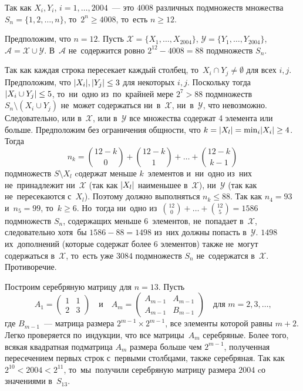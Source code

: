 \ifincludesolutions
Так как $X_i, Y_i$, $i = 1, \ldots, 2004$~--- это $4008$ различных подмножеств
множества $S_n = \{ 1, 2, \dots, n \}$, то~$2^n \geq 4008$, то~есть
$n \geq 12$.
\par
Предположим, что $n = 12$.
Пусть
$\mathcal{X} = \{ X_1, \ldots, X_{2004} \}$,
$\mathcal{Y} = \{ Y_1, \ldots, Y_{2004} \}$,
$\mathcal{A} = \mathcal{X} \cup \mathcal{Y}$.
В~$\mathcal{A}$ не~содержится ровно $2^{12} - 4008 = 88$ подмножеств $S_n$.
\par
Так как каждая строка пересекает каждый столбец,
то~$X_i \cap Y_j \neq \emptyset$ для всех $i, j$.
Предположим, что $\lvert X_i \rvert, \lvert Y_j \rvert \leq 3$ для некоторых $i, j$.
Поскольку тогда $\lvert X_i \cup Y_j \rvert \leq 5$, то~ни~одно из~по~крайней мере
$2^7 > 88$ подмножеств $S_n \setminus (X_i \cup Y_j)$ не~может содержаться
ни~в~$\mathcal{X}$, ни~в~$\mathcal{Y}$, что невозможно.
Следовательно, или в~$\mathcal{X}$, или в~$\mathcal{Y}$ все множества содержат
4 элемента или больше.
Предположим без ограничения общности, что
\(
    k = \lvert X_l \rvert = \min_i \lvert X_i \rvert \geq 4
\).
Тогда
\[
    n_k
=
    \binom{12 - k}{0} + \binom{12-k}{1} + \ldots + \binom{12-k}{k-1}
\]
подмножеств $S \setminus X_l$ cодержат меньше $k$~элементов и~ни~одно из~них
не~принадлежит ни~$\mathcal{X}$ (так как $\lvert X_l \rvert$ наименьшее
в~$\mathcal{X}$), ни~$\mathcal{Y}$ (так как не~пересекаются с~$X_l$).
Поэтому должно выполняться $n_k \leq 88$.
Так как $n_4 = 93$ и~$n_5 = 99$, то~$k \geq 6$.
Но~тогда ни~одно из~$\binom{12}{0} + \ldots + \binom{12}{5} = 1586$
подмножеств $S_n$, содержащих меньше 6~элементов, не~попадает в~$\mathcal{X}$,
следовательно хотя~бы $1586 - 88 = 1498$ из~них должны попасть в~$\mathcal{Y}$.
$1498$ их~дополнений (которые содержат более 6 элементов) также не~могут
содержаться в~$\mathcal{X}$, то~есть уже $3084$ подмножеств $S_n$ не~содержатся
в~$\mathcal{X}$.
Противоречие.
\par
Построим серебряную матрицу для $n = 13$.
Пусть
\[
    A_1
=
    \begin{pmatrix}
        1 & 1 \\
        2 & 3
    \end{pmatrix}
\quad\text{и}\quad
    A_m
=
    \begin{pmatrix}
        A_{m-1} & A_{m-1} \\
        A_{m-1} & B_{m-1}
    \end{pmatrix}
\quad\text{для $m = 2, 3, \ldots$,}
\]
где $B_{m-1}$~--- матрица размера $2^{m-1} \times 2^{m-1}$, все элементы
которой равны $m + 2$.
Легко проверяется по~индукции, что все матрицы~$A_m$ серебряные.
Более того, всякая квадратная подматрица $A_m$ размера больше чем $2^{m-1}$,
полученная пересечением первых строк с~первыми столбцами, также серебряная.
Так как $2^{10} < 2004 < 2^{11}$, то~мы~получили серебряную матрицу размера
$2004$ cо значениями в~$S_{13}$.
\fi %

\endgroup %

\endgroup %


